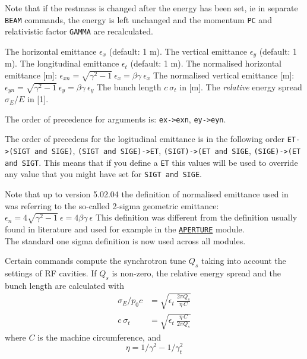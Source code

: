 Note that if the restmass is changed after the energy has been set, ie
in separate \texttt{BEAM} commands, the energy is left unchanged and the momentum
\texttt{PC} and relativistic factor \texttt{GAMMA} are recalculated. 
\\

\begin{madlist}
   The horizontal emittance $\epsilon_x$ (default: 1 m). 
   The vertical emittance $\epsilon_y$ (default: 1 m). 
   The longitudinal emittance $\epsilon_t$ (default: 1 m). 
   The normalised horizontal emittance [m]:
  $\epsilon_{xn} = \sqrt{\gamma^2 - 1} \ \epsilon_x =  \beta \gamma\ \epsilon_x$
   The normalised vertical emittance [m]:
  $\epsilon_{yn} = \sqrt{\gamma^2 - 1} \ \epsilon_y = \beta \gamma\ \epsilon_y$
   The bunch length $c\ \sigma_t$ in [m].  
   The \emph{relative} energy spread
  $\sigma_E / E$ in [1].  
\end{madlist} 

The order of precedence for arguments is: \texttt{ex->exn}, \texttt{ey->eyn}.

The order of precedens for the logitudinal emittance is in the following order \texttt{ET->(SIGT and SIGE)}, \texttt{(SIGT and SIGE)->ET}, \texttt{(SIGT)->(ET and SIGE}, \texttt{(SIGE)->(ET and SIGT}. This means that if you define a \texttt{ET} this values will be used to override any value that you might have set for \texttt{SIGT and SIGE}.  

Note that up to version 5.02.04 the definition of normalised emittance used in 
\madx was referring to the so-called 2-sigma geometric emittance:
$\epsilon_{n} = 4 \sqrt{\gamma^2 - 1} \ \epsilon = 4 \beta \gamma\ \epsilon$ 
This definition was different from the definition usually found in literature 
and used for example in the \hyperref[chap:aperture]{\texttt{APERTURE}} module.\\
The standard one sigma definition is now used across all \madx modules. 

Certain commands compute the synchrotron tune $Q_s$ taking into account
the settings of RF cavities. 
If $Q_s$ is non-zero, the relative energy spread and 
the bunch length are calculated with
\begin{align}
    \sigma_E / p_0 c  &=  \sqrt{\epsilon_t\ \frac{2 \pi Q_s}{\eta\ C}} \\
          c\ \sigma_t &= \sqrt{\epsilon_t\ \frac{\eta\ C}{2 \pi Q_s}}
\end{align}
where $C$ is the machine circumference, and 
\begin{equation}
  \eta = 1/\gamma^2 - 1/\gamma_t^2  
\end{equation}

